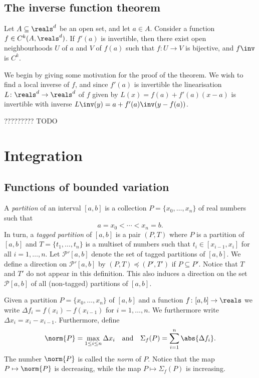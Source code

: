 \documentclass[article, a4paper, 11pt, oneside]{memoir}
\numberwithin{equation}{chapter}
\newcommand{\calP}{\mathcal{P}}
\newcommand{\calR}{\mathcal{R}}
\begin{document}
\section{The inverse function theorem}

\begin{theorem}
    Let $A \subseteq \reals^d$ be an open set, and let $a \in A$. Consider a function $f \in C^k(A,\reals^d)$. If $f'(a)$ is invertible, then there exist open neighbourhoods $U$ of $a$ and $V$ of $f(a)$ such that $f \colon U \to V$ is bijective, and $f\inv$ is $C^k$.
\end{theorem}
%
We begin by giving some motivation for the proof of the theorem. We wish to find a local inverse of $f$, and since $f'(a)$ is invertible the linearisation $L \colon \reals^d \to \reals^d$ of $f$ given by $L(x) = f(a) + f'(a)(x - a)$ is invertible with inverse $L\inv(y) = a + f'(a)\inv(y - f(a))$. 

????????? TODO


\chapter{Integration}

\section{Functions of bounded variation}

\newcommand{\boundedvar}[1]{\mathit{BV}[#1]}
\newcommand{\integrable}[2][]{\calR_{#1}[#2]}

A \emph{partition} of an interval $[a,b]$ is a collection $P = \{x_0, \ldots, x_n \}$ of real numbers such that
%
\begin{equation*}
    a = x_0 < \cdots < x_n = b.
\end{equation*}
%
In turn, a \emph{tagged partition} of $[a,b]$ is a pair $(P,T)$ where $P$ is a partition of $[a,b]$ and $T = \{t_1, \ldots, t_n\}$ is a multiset of numbers such that $t_i \in [x_{i-1}, x_i]$ for all $i = 1, \ldots, n$. Let $\calP'[a,b]$ denote the set of tagged partitions of $[a,b]$. We define a direction on $\calP'[a,b]$ by $(P,T) \preceq (P',T')$ if $P \subseteq P'$. Notice that $T$ and $T'$ do not appear in this definition. This also induces a direction on the set $\calP[a,b]$ of all (non-tagged) partitions of $[a,b]$.

Given a partition $P = \{x_0, \ldots, x_n \}$ of $[a,b]$ and a function $f \colon [a,b] \to \reals$ we write $\Delta f_i = f(x_i) - f(x_{i-1})$ for $i = 1, \ldots, n$. We furthermore write $\Delta x_i = x_i - x_{i-1}$. Furthermore, define
%
\begin{equation*}
    \norm{P}
        = \max_{1 \leq i \leq n} \Delta x_i
    \quad \text{and} \quad
    \Sigma_f(P)
        = \sum_{i=1}^n \abs{\Delta f_i}.
\end{equation*}
%
The number $\norm{P}$ is called the \emph{norm} of $P$. Notice that the map $P \mapsto \norm{P}$ is decreasing, while the map $P \mapsto \Sigma_f(P)$ is increasing.
\end{document}
